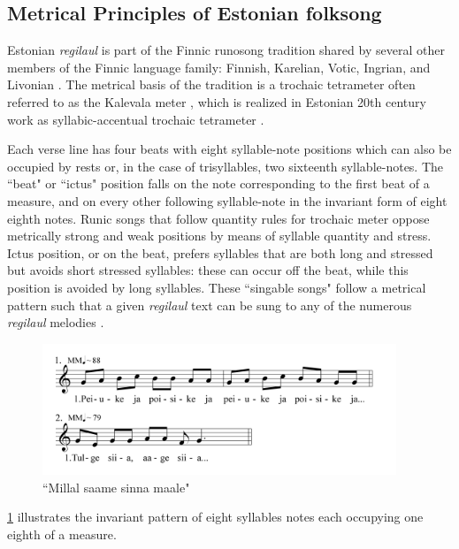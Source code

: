 \subsection{Metrical Principles of Estonian folksong}

Estonian {\it regilaul} is part of the Finnic runosong tradition shared by several other members of the Finnic language family: Finnish, Karelian, Votic, Ingrian, and Livonian \citep{rossLehiste2001}. The metrical basis of the tradition is a trochaic tetrameter often referred to as the Kalevala meter \citep{oras2019}, which is realized in Estonian 20th century work as syllabic-accentual trochaic tetrameter \citep{lotmanLotman2013}. 

Each verse line has four beats with eight syllable-note positions which can also be occupied by rests or, in the case of trisyllables, two sixteenth syllable-notes. The ``beat" or ``ictus" position falls on the note corresponding to the first beat of a measure, and on every other following syllable-note in the invariant form of eight eighth notes. Runic songs that follow quantity rules for trochaic meter oppose metrically strong and weak positions by means of syllable quantity and stress. Ictus position, or on the beat, prefers syllables that are both long and stressed but avoids short stressed syllables: these can occur off the beat, while this position is avoided by long syllables. 
These ``singable songs" \citep{tormis1985} follow a metrical pattern such that a given {\it regilaul} text can be sung to any of the numerous {\it regilaul} melodies \citep{rossLehiste2001}. 


\begin{figure}[ht]
\begin{center}
\includegraphics[width=300pt]{figures/045.png}
\caption{``Millal saame sinna maale"}
\label{045}
\end{center}
\end{figure}
\ref{045} illustrates the invariant pattern of eight syllables notes each occupying one eighth of a  measure. 

